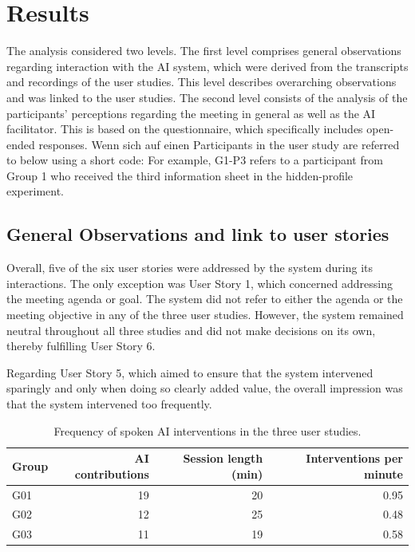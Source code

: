 \section{Results}

The analysis considered two levels. The first level comprises general observations regarding interaction with
the AI system, which were derived from the transcripts and recordings of the user studies. This level
describes overarching observations and was linked to the user studies. The second level consists of the
analysis of the participants’ perceptions regarding the meeting in general as well as the AI facilitator.
This is based on the questionnaire, which specifically includes open-ended responses. Wenn sich auf einen
Participants in the user study are referred to below using a short code: For example, G1-P3 refers to a
participant from Group 1 who received the third information sheet in the hidden-profile experiment.
\subsection{General Observations and link to user stories}

Overall, five of the six user stories were addressed by the system during its interactions. The only
exception was User Story 1, which concerned addressing the meeting agenda or goal. The system did not refer
to either the agenda or the meeting objective in any of the three user studies. However, the system remained
neutral throughout all three studies and did not make decisions on its own, thereby fulfilling User Story 6.

Regarding User Story 5, which aimed to ensure that the system intervened sparingly and only when doing so
clearly added value, the overall impression was that the system intervened too frequently.

\begin{table}[H]
  \centering
  \caption{Frequency of spoken AI interventions in the three user studies.}
  \label{tab:intervention-frequency}
  \footnotesize
  \begin{tabular}{@{}lrrr@{}}
    \toprule
    Group & AI contributions & Session length (min) & Interventions per minute \\
    \midrule
    G01 & 19 & 20 & 0.95 \\
    G02 & 12 & 25 & 0.48 \\
    G03 & 11 & 19 & 0.58 \\
    \bottomrule
  \end{tabular}
\end{table}

